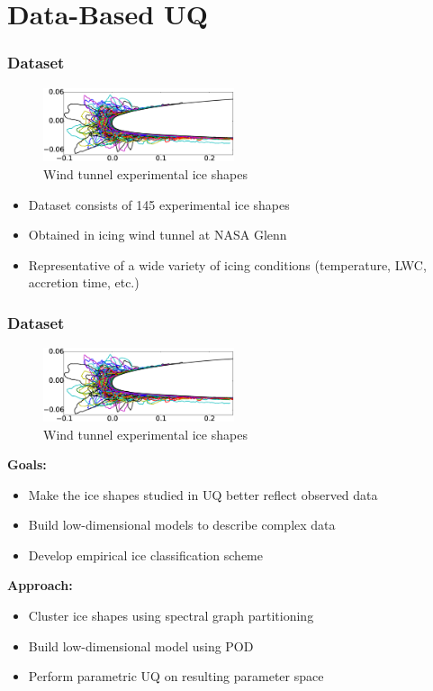 \documentclass[9pt]{beamer}
\begin{document}
\section{Data-Based UQ}
\label{sec-3}
\begin{frame}
\frametitle{Dataset}
\label{sec-3-1}

\vspace*{-0.0cm}\begin{figure}
      \includegraphics[width=0.5\textwidth]{GlobalDataSet}
      \caption{Wind tunnel experimental ice shapes}
\end{figure}
\begin{itemize}
\item Dataset consists of 145 experimental ice shapes
\item Obtained in icing wind tunnel at NASA Glenn\footnotemark[1]
\item Representative of a wide variety of icing conditions (temperature,
  LWC, accretion time, etc.)
\end{itemize}
\end{frame}
\begin{frame}
\frametitle{Dataset}
\label{sec-3-2}

\vspace*{-0.0cm}\begin{figure}
      \includegraphics[width=0.5\textwidth]{GlobalDataSet}
      \caption{Wind tunnel experimental ice shapes}
\end{figure}
\textbf{Goals:}
\begin{itemize}
\item Make the ice shapes studied in UQ better reflect observed data
\item Build low-dimensional models to describe complex data
\item Develop empirical ice classification scheme
\end{itemize}
\textbf{Approach:}
\begin{itemize}
\item Cluster ice shapes using spectral graph partitioning
\item Build low-dimensional model using POD
\item Perform parametric UQ on resulting parameter space
\end{itemize}
\end{frame}
\end{document}
